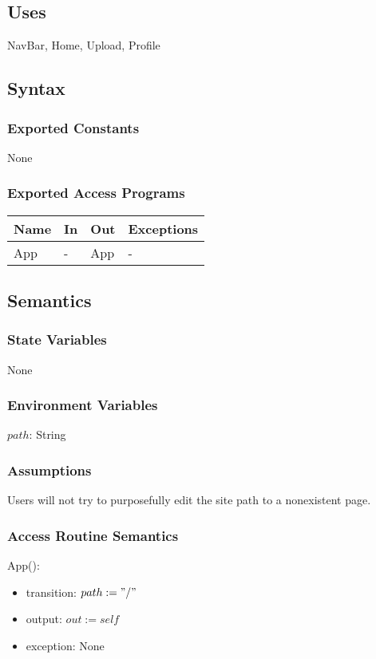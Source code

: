 \documentclass[12pt, titlepage]{article}
\begin{document}
\subsection{Uses}
NavBar, Home, Upload, Profile
\subsection{Syntax}
\subsubsection{Exported Constants}
None
\subsubsection{Exported Access Programs}
\begin{center}
	\begin{tabular}{p{3cm} p{4cm} p{4cm} p{3cm}}
		
		\hline
		\textbf{Name} & \textbf{In} & \textbf{Out} & \textbf{Exceptions} \\
		\hline
		App & - & App & - \\
		\hline
	\end{tabular}
\end{center}
\subsection{Semantics}
\subsubsection{State Variables}
None
\subsubsection{Environment Variables}
$path$: String
\subsubsection{Assumptions}
Users will not try to purposefully edit the site path to a nonexistent page.
\subsubsection{Access Routine Semantics}
App():
\begin{itemize}
	\item transition: $path := "/"$
	\item output: $out := self$
	\item exception: None
\end{itemize}
\end{document}
